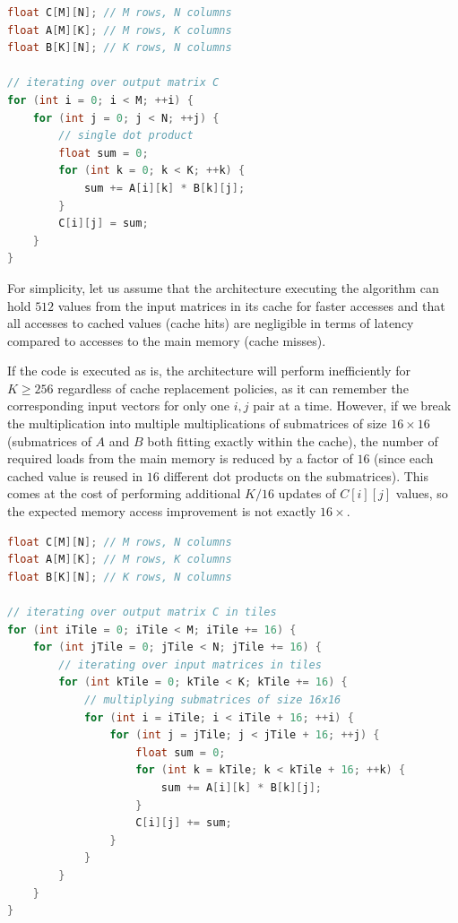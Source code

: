 \begin{lstlisting}[language=C++, caption={Matrix multiplication}, label={lst:matrix-multiplication}]
float C[M][N]; // M rows, N columns
float A[M][K]; // M rows, K columns
float B[K][N]; // K rows, N columns

// iterating over output matrix C
for (int i = 0; i < M; ++i) {
    for (int j = 0; j < N; ++j) {
        // single dot product
        float sum = 0;
        for (int k = 0; k < K; ++k) {
            sum += A[i][k] * B[k][j];
        }
        C[i][j] = sum;
    }
}
\end{lstlisting}

For simplicity, let us assume that the architecture executing the algorithm can hold $512$ values from the input matrices in its cache for faster accesses and that all accesses to cached values (cache hits) are negligible in terms of latency compared to accesses to the main memory (cache misses).

If the code is executed as is, the architecture will perform inefficiently for $K \ge 256$ regardless of cache replacement policies, as it can remember the corresponding input vectors for only one $i, j$ pair at a time.
However, if we break the multiplication into multiple multiplications of submatrices of size $16 \times 16$ (submatrices of $A$ and $B$ both fitting exactly within the cache), the number of required loads from the main memory is reduced by a factor of $16$ (since each cached value is reused in $16$ different dot products on the submatrices). This comes at the cost of performing additional $K / 16$ updates of $C[i][j]$ values, so the expected memory access improvement is not exactly $16\times$.


\begin{lstlisting}[language=C++, caption={Tiled matrix multiplication}, label={lst:tiled-matrix-multiplication}]
float C[M][N]; // M rows, N columns
float A[M][K]; // M rows, K columns
float B[K][N]; // K rows, N columns

// iterating over output matrix C in tiles
for (int iTile = 0; iTile < M; iTile += 16) {
    for (int jTile = 0; jTile < N; jTile += 16) {
        // iterating over input matrices in tiles
        for (int kTile = 0; kTile < K; kTile += 16) {
            // multiplying submatrices of size 16x16
            for (int i = iTile; i < iTile + 16; ++i) {
                for (int j = jTile; j < jTile + 16; ++j) {
                    float sum = 0;
                    for (int k = kTile; k < kTile + 16; ++k) {
                        sum += A[i][k] * B[k][j];
                    }
                    C[i][j] += sum;
                }
            }
        }
    }
}
\end{lstlisting}


